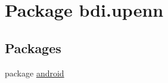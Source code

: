 \hypertarget{namespacebdi_1_1upenn}{\section{Package bdi.\-upenn}
\label{namespacebdi_1_1upenn}
}
\subsection*{Packages}
\begin{DoxyCompactItemize}
\item 
package \hyperlink{namespacebdi_1_1upenn_1_1android}{android}
\end{DoxyCompactItemize}
